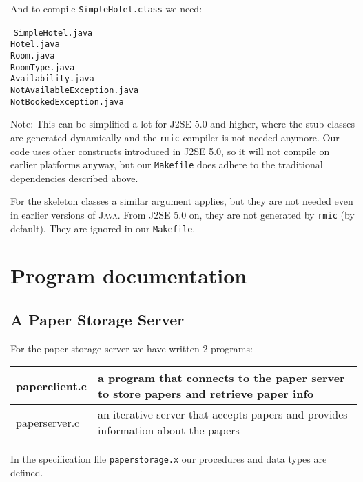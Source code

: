\documentclass[a4paper,10pt]{article}
\begin{document}
And to compile \texttt{SimpleHotel.class} we need:
\begin{tabbing}
\hspace{20pt}\=\kill
 \> \texttt{SimpleHotel.java} \\
 \> \texttt{Hotel.java} \\
 \> \texttt{Room.java} \\
 \> \texttt{RoomType.java} \\
 \> \texttt{Availability.java} \\
 \> \texttt{NotAvailableException.java} \\
 \> \texttt{NotBookedException.java}
\end{tabbing}

Note: This can be simplified a lot for \textsc{J2SE 5.0} and higher,
where the stub classes are generated dynamically and the \texttt{rmic}
compiler is not needed anymore. Our code uses other constructs
introduced in \textsc{J2SE 5.0}, so it will not compile on earlier
platforms anyway, but our \texttt{Makefile} does adhere to the
traditional dependencies described above.

For the skeleton classes a similar argument applies, but they are not
needed even in earlier versions of \textsc{Java}. From \textsc{J2SE 5.0}
on, they are not generated by \texttt{rmic} (by default). They are
ignored in our \texttt{Makefile}.


\section{Program documentation}
\subsection{A Paper Storage Server}

For the paper storage server we have written 2 programs:
\begin{center}
\begin{tabular}{ l | p{9cm} }
paperclient.c & a program that connects to the paper server to store papers and retrieve paper info\\ \hline
paperserver.c & an iterative server that accepts papers and provides information about the papers\\
\end{tabular}
\end{center}

In the specification file \texttt{paperstorage.x} our procedures and data types are defined.
\end{document}
